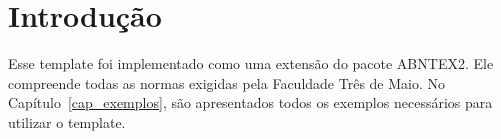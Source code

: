 \chapter*[Introdução]{Introdução}\label{chap:intro}

Esse template foi implementado como uma extensão do pacote ABNTEX2. Ele compreende todas as normas exigidas pela Faculdade Três de Maio. 
No Capítulo~\ref{cap_exemplos}, são apresentados todos os exemplos necessários para utilizar o template.
